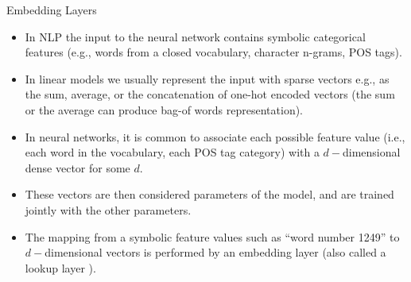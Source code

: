 \documentclass[handout]{beamer}
\begin{document}
\begin{frame}{Embedding Layers}
\begin{scriptsize}
\begin{itemize}

\item In NLP the input to the neural network contains symbolic categorical features (e.g., words from a closed vocabulary, character n-grams, POS tags).

\item In linear models we usually represent the input with sparse vectors e.g., as the sum, average,  or the concatenation of one-hot encoded vectors (the sum or the average can produce bag-of words representation). 

\item In neural networks, it is common to associate each possible feature value (i.e., each word in the vocabulary, each POS tag category) with a $d-$dimensional dense vector for some $d$.

\item These vectors are then considered parameters of the model, and are trained jointly with the other parameters.

\item The mapping from a symbolic feature values such as ``word number 1249'' to $d-$dimensional vectors is performed by an embedding layer (also called a lookup layer ).

\end{itemize}
\end{scriptsize}
\end{frame}
\end{document}
